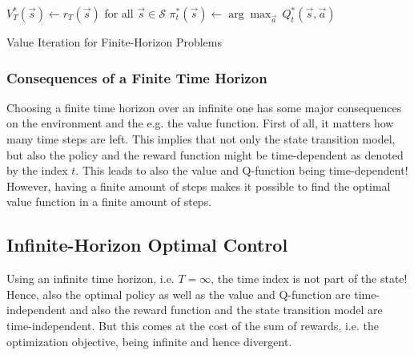 				\begin{algorithm}  \DontPrintSemicolon
					\( V_T^\ast(\vec{s}) \gets r_T(\vec{s}) \) for all \( \vec{s} \in \mathcal{S} \) \;
					\Return \( \pi_t^\ast(\vec{s}) \gets \arg\max_{\vec{a}} \, Q_t^\ast(\vec{s}, \vec{a}) \)  \label{algline:valueIterationFiniteHorizon-piComputation} \;

					\caption{Value Iteration for Finite-Horizon Problems}
					\label{alg:valueIterationFiniteHorizon}
				\end{algorithm}

			\subsubsection{Consequences of a Finite Time Horizon}
				Choosing a finite time horizon over an infinite one has some major consequences on the environment and the e.g. the value function. First of all, it matters how many time steps are left. This implies that not only the state transition model, but also the policy and the reward function might be time-dependent as denoted by the index \(t\). This leads to also the value and Q-function being time-dependent! However, having a finite amount of steps makes it possible to find the optimal value function in a finite amount of steps.

		\subsection{Infinite-Horizon Optimal Control}
			Using an infinite time horizon, i.e. \( T = \infty \), the time index is not part of the state! Hence, also the optimal policy as well as the value and Q-function are time-independent and also the reward function and the state transition model are time-independent. But this comes at the cost of the sum of rewards, i.e. the optimization objective, being infinite and hence divergent.

